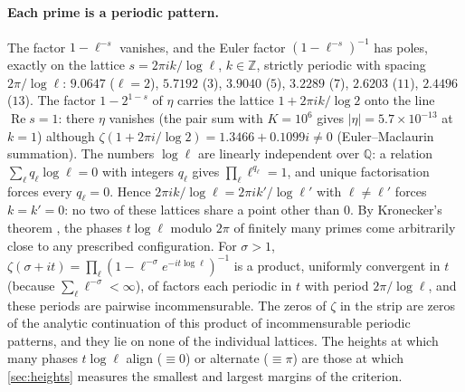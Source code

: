 \documentclass[11pt]{article}
\theoremstyle{definition}\newtheorem{definition}[theorem]{Definition}
\theoremstyle{remark}\newtheorem{remark}[theorem]{Remark}
\renewcommand{\Re}{\operatorname{Re}}\renewcommand{\Im}{\operatorname{Im}}
\begin{document}
\paragraph{Each prime is a periodic pattern.} The factor $1-\ell^{-s}$ vanishes, and the Euler factor $(1-\ell^{-s})^{-1}$ has poles, exactly on the lattice $s=2\pi ik/\log\ell$, $k\in\mathbb Z$, strictly periodic with spacing $2\pi/\log\ell$: $9.0647$ ($\ell=2$), $5.7192$ ($3$), $3.9040$ ($5$), $3.2289$ ($7$), $2.6203$ ($11$), $2.4496$ ($13$). The factor $1-2^{1-s}$ of $\eta$ carries the lattice $1+2\pi ik/\log2$ onto the line $\Re s=1$: there $\eta$ vanishes (the pair sum with $K=10^6$ gives $|\eta|=5.7\times10^{-13}$ at $k=1$) although $\zeta(1+2\pi i/\log2)=1.3466+0.1099i\ne0$ (Euler--Maclaurin summation). The numbers $\log\ell$ are linearly independent over $\mathbb Q$: a relation $\sum_\ell q_\ell\log\ell=0$ with integers $q_\ell$ gives $\prod_\ell\ell^{q_\ell}=1$, and unique factorisation forces every $q_\ell=0$. Hence $2\pi ik/\log\ell=2\pi ik'/\log\ell'$ with $\ell\ne\ell'$ forces $k=k'=0$: no two of these lattices share a point other than $0$. By Kronecker's theorem \cite[Ch.~XXIII]{HardyWright}, the phases $t\log\ell$ modulo $2\pi$ of finitely many primes come arbitrarily close to any prescribed configuration. For $\sigma>1$, $\zeta(\sigma+it)=\prod_\ell(1-\ell^{-\sigma}e^{-it\log\ell})^{-1}$ is a product, uniformly convergent in $t$ (because $\sum_\ell\ell^{-\sigma}<\infty$), of factors each periodic in $t$ with period $2\pi/\log\ell$, and these periods are pairwise incommensurable. The zeros of $\zeta$ in the strip are zeros of the analytic continuation of this product of incommensurable periodic patterns, and they lie on none of the individual lattices. The heights at which many phases $t\log\ell$ align ($\equiv0$) or alternate ($\equiv\pi$) are those at which \cref{sec:heights} measures the smallest and largest margins of the criterion.
\end{document}
